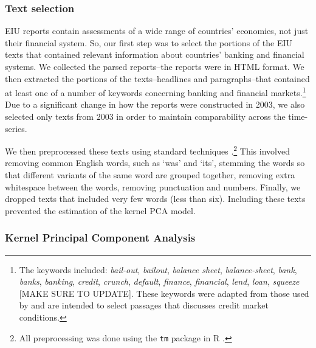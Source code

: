 \documentclass[]{article}
\begin{document}
\subsubsection{Text selection}\label{text-selection}

EIU reports contain assessments of a wide range of countries' economies,
not just their financial system. So, our first step was to select the
portions of the EIU texts that contained relevant information about
countries' banking and financial systems. We collected the parsed
reports--the reports were in HTML format. We then extracted the portions
of the texts--headlines and paragraphs--that contained at least one of a
number of keywords concerning banking and financial markets.\footnote{The
  keywords included: \emph{bail-out}, \emph{bailout}, \emph{balance
  sheet}, \emph{balance-sheet}, \emph{bank}, \emph{banks},
  \emph{banking}, \emph{credit}, \emph{crunch}, \emph{default},
  \emph{finance}, \emph{financial}, \emph{lend}, \emph{loan},
  \emph{squeeze} {[}MAKE SURE TO UPDATE{]}. These keywords were adapted
  from those used by \cite{Romer2015} and are intended to
  select passages that discusses credit market conditions.} Due to a
significant change in how the reports were constructed in 2003, we also
selected only texts from 2003 in order to maintain comparability across
the time-series.

We then preprocessed these texts using standard techniques \citep[see][]{Grimmer2013}.\footnote{All preprocessing was done using the
  \texttt{tm} package \citep{tm2015} in R \citep{R-cite}.} This involved removing common English words, such as `was' and
`its', stemming the words so that different variants of the same word
are grouped together, removing extra whitespace between the words,
removing punctuation and numbers. Finally, we dropped texts that
included very few words (less than six). Including these texts prevented
the estimation of the kernel PCA model.

\subsubsection{Kernel Principal Component
Analysis}\label{kernel-principal-component-analysis}
\end{document}
